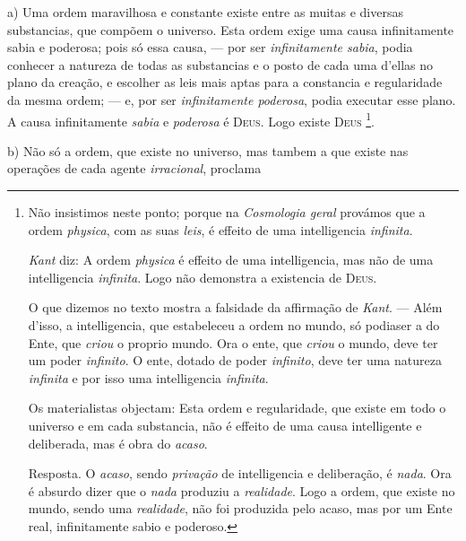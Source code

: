 a) Uma ordem maravilhosa e constante existe entre as muitas e diversas substancias, que compõem o universo. Esta ordem exige uma causa infinitamente sabia e poderosa; pois só essa causa, --- por ser \emph{infinitamente sabia}, podia conhecer a natureza de todas as substancias e o posto de cada uma d'ellas no plano da creação, e escolher as leis mais aptas para a constancia e regularidade da mesma ordem; --- e, por ser \emph{infinitamente poderosa}, podia executar esse plano. A causa infinitamente \emph{sabia} e \emph{poderosa} é \textsc{Deus}. Logo existe \textsc{Deus} \footnote{Não insistimos neste ponto; porque na \emph{Cosmologia geral} provámos que a ordem \emph{physica}, com as suas \emph{leis}, é effeito de uma intelligencia \emph{infinita}.\par \emph{Kant} diz: A ordem \emph{physica} é effeito de uma intelligencia, mas não de uma intelligencia \emph{infinita}. Logo não demonstra a existencia de \textsc{Deus}.\par O que dizemos no texto mostra a falsidade da affirmação de \emph{Kant}. --- Além d'isso, a intelligencia, que estabeleceu a ordem no mundo, só podiaser a do Ente, que \emph{criou} o proprio mundo. Ora o ente, que \emph{criou} o mundo, deve ter um poder \emph{infinito}. O ente, dotado de poder \emph{infinito}, deve ter uma natureza \emph{infinita} e por isso uma intelligencia \emph{infinita}.\par Os materialistas objectam: Esta ordem e regularidade, que existe em todo o universo e em cada substancia, não é effeito de uma causa intelligente e deliberada, mas é obra do \emph{acaso}.\par Resposta. O \emph{acaso}, sendo \emph{privação} de intelligencia e deliberação, é \emph{nada}. Ora é absurdo dizer que o \emph{nada} produziu a \emph{realidade}. Logo a ordem, que existe no mundo, sendo uma \emph{realidade}, não foi produzida pelo acaso, mas por um Ente real, infinitamente sabio e poderoso.}.

b) Não só a ordem, que existe no universo, mas tambem a que existe nas operações de cada agente \emph{irracional}, proclama